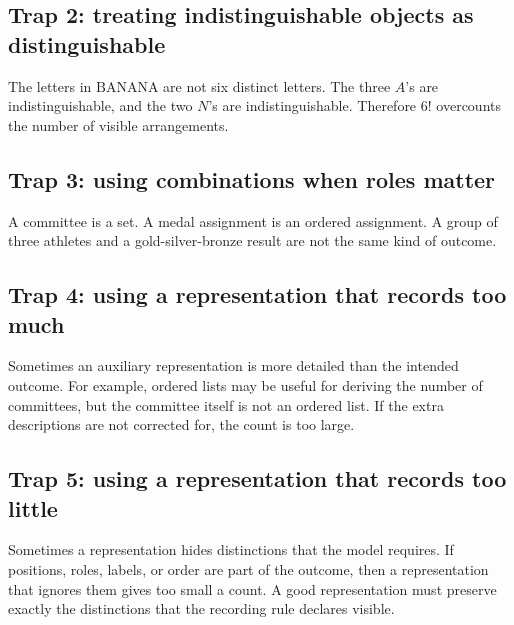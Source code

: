 \subsection*{Trap 2: treating indistinguishable objects as distinguishable}

The letters in \(\text{BANANA}\) are not six distinct letters. The three \(A\)'s are indistinguishable, and the two \(N\)'s are indistinguishable. Therefore \(6!\) overcounts the number of visible arrangements.

\subsection*{Trap 3: using combinations when roles matter}

A committee is a set. A medal assignment is an ordered assignment. A group of three athletes and a gold-silver-bronze result are not the same kind of outcome.

\subsection*{Trap 4: using a representation that records too much}

Sometimes an auxiliary representation is more detailed than the intended outcome. For example, ordered lists may be useful for deriving the number of committees, but the committee itself is not an ordered list. If the extra descriptions are not corrected for, the count is too large.

\subsection*{Trap 5: using a representation that records too little}

Sometimes a representation hides distinctions that the model requires. If positions, roles, labels, or order are part of the outcome, then a representation that ignores them gives too small a count. A good representation must preserve exactly the distinctions that the recording rule declares visible.
